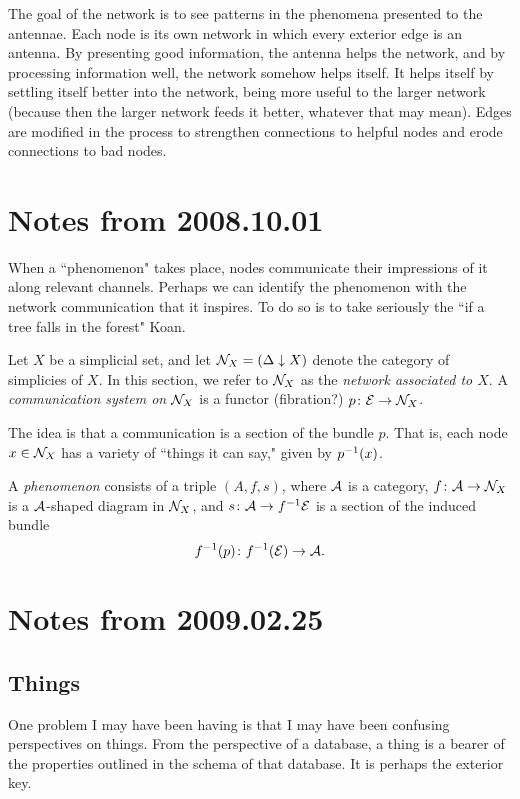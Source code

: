\documentclass{amsart}
\begin{document}
The goal of the network is to see patterns in the phenomena presented to the antennae.  Each node is its own network in which every exterior edge is an antenna.  By presenting good information, the antenna helps the network, and by processing information well, the network somehow helps itself.  It helps itself by settling itself better into the network, being more useful to the larger network (because then the larger network feeds it better, whatever that may mean).  Edges are modified in the process to strengthen connections to helpful nodes and erode connections to bad nodes.

\section{Notes from 2008.10.01}

When a ``phenomenon" takes place, nodes communicate their impressions of it along relevant channels.  Perhaps we can identify the phenomenon with the network communication that it inspires.  To do so is to take seriously the ``if a tree falls in the forest" Koan.\vspace{.1in}

Let $X$ be a simplicial set, and let $\mathcal{N}_X=(\Delta\downarrow X)$ denote the category of simplicies of $X$.  In this section, we refer to $\mathcal{N}_X$ as the {\em network associated to $X$}.  A {\em communication system on $\mathcal{N}_X$} is a functor (fibration?) $p\colon\mathcal{E}\rightarrow\mathcal{N}_X$.

The idea is that a communication is a section of the bundle $p$.  That is, each node $x\in\mathcal{N}_X$ has a variety of ``things it can say," given by $p^\m1(x)$.  

A {\em phenomenon} consists of a triple $(A,f,s)$, where $\mathcal{A}$ is a category, $f\colon\mathcal{A}\rightarrow\mathcal{N}_X$ is a $\mathcal{A}$-shaped diagram in $\mathcal{N}_X$, and $s\taking\mcA\to f^\m1\mcE$ is a section of the induced bundle $$f^\m1(p)\taking f^\m1(\mcE)\to\mcA.$$

\section{Notes from 2009.02.25}

\subsection{Things}

One problem I may have been having is that I may have been confusing perspectives on things.  From the perspective of a database, a thing is a bearer of the properties outlined in the schema of that database.  It is perhaps the exterior key. 
\end{document}
